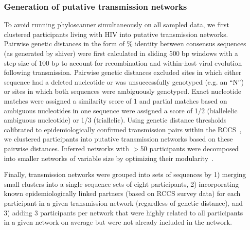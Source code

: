 \documentclass[10pt,letterpaper]{article}
\begin{document}
\subsubsection{Generation of putative transmission networks}
To avoid running phyloscanner simultaneously on all sampled data, we first clustered participants living with HIV into putative transmission networks. Pairwise genetic distances in the form of \% identity between consensus sequences (as generated by shiver) were first calculated in sliding 500 bp windows with a step size of 100 bp to account for recombination and within-host viral evolution following transmission. Pairwise genetic distances excluded sites in which either sequence had a deleted nucleotide or was unsuccessfully genotyped (e.g. an ``N'') or sites in which both sequences were ambiguously genotyped. Exact nucleotide matches were assigned a similarity score of 1 and partial matches based on ambiguous nucleotides in one sequence were assigned a score of 1/2 (biallelelic ambiguous nucleotide) or 1/3 (triallelic). Using genetic distance thresholds calibrated to epidemiologically confirmed transmission pairs within the RCCS~\cite{ratmann2019}, we clustered participants into putative transmission networks based on these pairwise distances. Inferred networks with $>$50 participants were decomposed into smaller networks of variable size by optimizing their modularity~\cite{blondel2008}.\par 

Finally, transmission networks were grouped into sets of sequences by 1) merging small clusters into a single sequence sets of eight participants, 2) incorporating known epidemiologically linked partners (based on RCCS survey data) for each participant in a given transmission network (regardless of genetic distance), and 3) adding 3 participants per network that were highly related to all participants in a given network on average but were not already included in the network. \par

\linespread{1}

\end{document}
